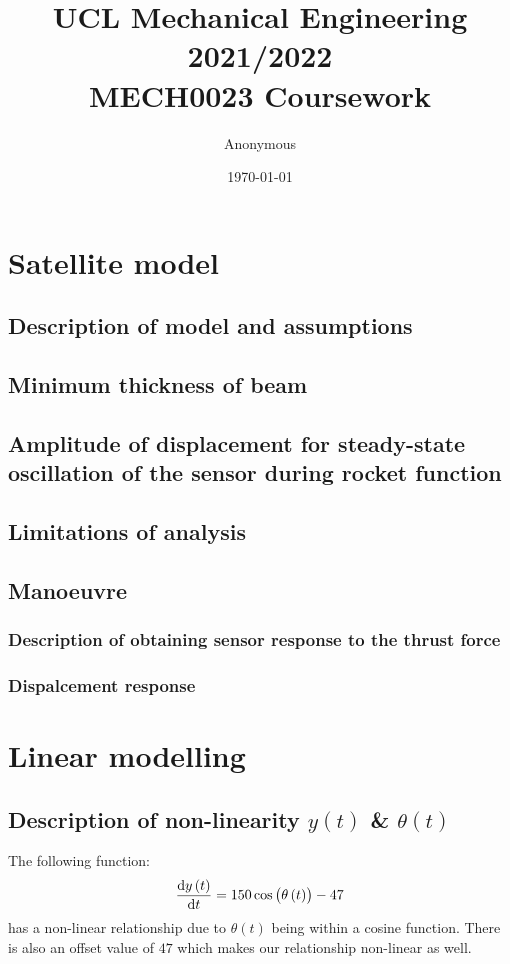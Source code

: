 \documentclass[11pt]{article}
\numberwithin{equation}{section}
\begin{document}
\title{\textbf{UCL Mechanical Engineering 2021/2022}\\MECH0023 Coursework}
\author{Anonymous}
\date{\today}
\maketitle
\tableofcontents
\listoffigures
\section{Satellite model}
\subsection{Description of model and assumptions}
\subsection{Minimum thickness of beam}
\subsection{Amplitude of displacement for steady-state oscillation of the sensor during rocket function}
\subsection{Limitations of analysis}
\subsection{Manoeuvre}
\subsubsection{Description of obtaining sensor response to the thrust force}
\subsubsection{Dispalcement response}
\section{Linear modelling}
\subsection{Description of non-linearity $y(t)$ \& $\theta(t)$}
The following function:
\begin{equation}
    \frac{\dif y\left( t\right)}{\dif t} = 150 \cos \left(\theta\left(t\right)\right) - 47
\end{equation}
has a non-linear relationship due to $\theta(t)$ being within a cosine function. There is also an offset value of $47$ which makes our relationship non-linear as well.
\end{document}
